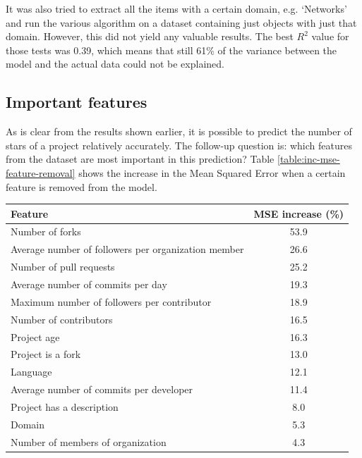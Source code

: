         It was also tried to extract all the items with a certain domain, e.g. `Networks' and run the various algorithm on a dataset containing just objects with just that domain. However, this did not yield any valuable results. 
        The best $R^2$ value for those tests was 0.39, which means that still 61\% of the variance between the model and the actual data could not be explained.
        
    \subsection{Important features}
        As is clear from the results shown earlier, it is possible to predict the number of stars of a project relatively accurately. 
        The follow-up question is: which features from the dataset are most important in this prediction? 
        Table \ref{table:inc-mse-feature-removal} shows the increase in the Mean Squared Error when a certain feature is removed from the model.
        \begin{center}
        \begin{tabular}[width=250pt]{|p{5cm}|c|}
            \hline
            Feature                                                       & MSE increase (\%) \\
            \hline
                Number of forks                                            & 53.9     \\
                Average number of followers per organization member        & 26.6    \\
                Number of pull requests                                    & 25.2     \\
                Average number of commits per day                          & 19.3     \\
                Maximum number of followers per contributor                & 18.9                   \\                    
                Number of contributors                                     & 16.5      \\
                Project age                                                & 16.3  \\
                Project is a fork                                          & 13.0      \\
                Language                                                   & 12.1      \\
                Average number of commits per developer                    & 11.4         \\
                Project has a description                                  & 8.0 \\
                Domain                                                     & 5.3 \\
                Number of members of organization                          & 4.3 \\
            \hline
        \end{tabular}
        \label{table:inc-mse-feature-removal}
     \end{center}
     
